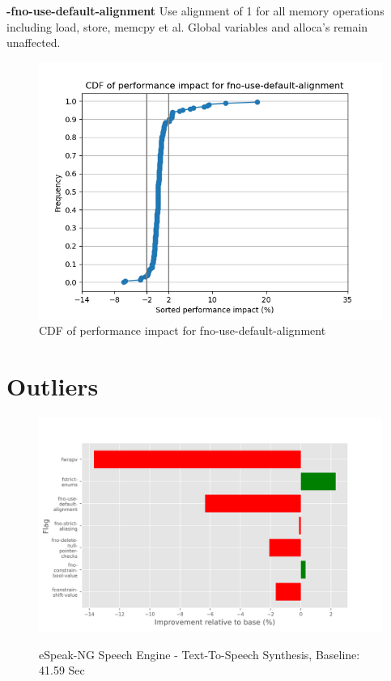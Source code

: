 \documentclass{sciposter}
\begin{document}
\begin{multicols}{3}
\textbf{-fno-use-default-alignment} Use alignment of 1 for all memory operations
including load, store, memcpy et al. Global variables and alloca's remain
unaffected.\\
\begin{figure}[h!]
\centering
\includegraphics[scale=1.2]{fno-use-default-alignment}
\caption{CDF of performance impact for fno-use-default-alignment}
\end{figure}

\section{Outliers}
\begin{figure}[h!]
\centering
\includegraphics[scale=1.3]{espeak} \\
\caption{eSpeak-NG Speech Engine - Text-To-Speech Synthesis, Baseline: 41.59 Sec} 
\end{figure}


\end{multicols}
\end{document}
